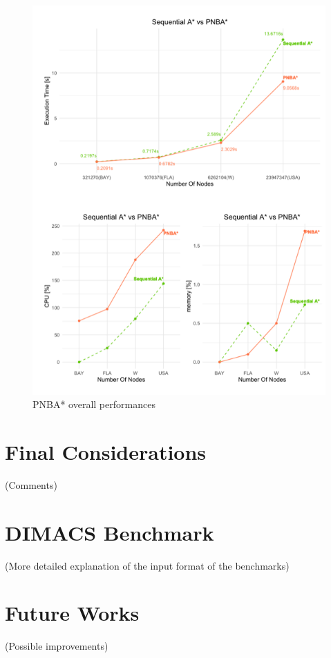 \documentclass[twocolumn, switch]{article} %
\begin{document}
\begin{figure}[ht!]
  \centering
  \includegraphics[width=1\linewidth]{pnba/pnba.png}
  \caption{PNBA* overall performances}
  \label{pnbatot}
\end{figure}

\section{Final Considerations}
(Comments)

\section{DIMACS Benchmark}
(More detailed explanation of the input format of the benchmarks)

\section{Future Works}
(Possible improvements)
\end{document}
